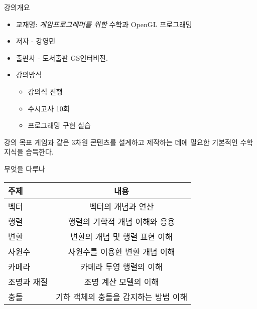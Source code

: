 \begin{frame}{강의개요}
\begin{itemize}
  \item 교재명: {\small \it 게임프로그래머를 위한} 수학과 OpenGL 프로그래밍
  \item 저자 - 강영민
  \item 출판사 -  도서출판 GS인터비전.
  \item 강의방식
    \begin{itemize}
      \item 강의식 진행
      \item 수시고사 10회
      \item 프로그래밍 구현 실습
    \end{itemize} 
\end{itemize}

\begin{block}{강의 목표}
게임과 같은 3차원 콘텐츠를 설계하고 제작하는 데에 필요한 기본적인 수학 지식을 습득한다.
\end{block}

\end{frame}


\begin{frame}{무엇을 다루나}


\begin{table}
\centering
\begin{tabular}{l|c}  \hline
주제 & 내용 \\\hline  \hline
벡터 & 벡터의 개념과 연산 \\ \hline
행렬 & 행렬의 기학적 개념 이해와 응용 \\ \hline
변환 & 변환의 개념 및 행렬 표현 이해 \\ \hline
사원수 & 사원수를 이용한 변환 개념 이해 \\ \hline
카메라 & 카메라 투영 행렬의 이해 \\ \hline
조명과 재질 & 조명 계산 모델의 이해 \\ \hline
충돌 & 기하 객체의 충돌을 감지하는 방법 이해 \\ \hline
\end{tabular}
\end{table}

\end{frame}


